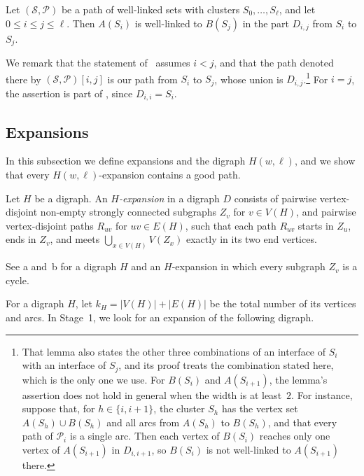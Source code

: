 \documentclass[fontsize=12pt,leading=14pt]{fullpaper}
\newcommand{\Pcal}{\mathcal{P}}
\newcommand{\Scal}{\mathcal{S}}
\newcommand{\Hwl}{H(w,\ell)}
\begin{document}
\begin{proposition}\label{lem:consecutive}
  Let $(\Scal,\Pcal)$ be a path of well-linked sets with clusters $S_0,\dots,S_\ell$, and let $0\le i\le j\le\ell$.
  Then $A(S_i)$ is well-linked to $B(S_j)$ in the part $D_{i,j}$ from $S_i$ to $S_j$.
\end{proposition}

We remark that the statement of~\cite[Lemma~8.4]{HKMM26a} assumes $i<j$, and that the path denoted there by $(\Scal,\Pcal)[i,j]$ is our path from $S_i$ to $S_j$, whose union is $D_{i,j}$.\footnote{%
  That lemma also states the other three combinations of an interface of $S_i$ with an interface of $S_j$, and its proof treats the combination stated here, which is the only one we use.
  For $B(S_i)$ and $A(S_{i+1})$, the lemma's assertion does not hold in general when the width is at least~$2$.
  For instance, suppose that, for $h\in\{i,i+1\}$, the cluster $S_h$ has the vertex set $A(S_h)\cup B(S_h)$ and all arcs from $A(S_h)$ to $B(S_h)$, and that every path of $\Pcal_i$ is a single arc.
Then each vertex of $B(S_i)$ reaches only one vertex of $A(S_{i+1})$ in $D_{i,i+1}$, so $B(S_i)$ is not well-linked to $A(S_{i+1})$ there.}
For $i=j$, the assertion is part of , since $D_{i,i}=S_i$.

\subsection{Expansions}\label{sec:prelim-expansions}

In this subsection we define expansions and the digraph $\Hwl$, and we show that every $\Hwl$-expansion contains a good path.

\begin{definition}[Expansion]\label{def:expansion}
  Let $H$ be a digraph.
  An \emph{$H$-expansion} in a digraph $D$ consists of pairwise vertex-disjoint non-empty strongly connected subgraphs $Z_v$ for $v\in V(H)$, and pairwise vertex-disjoint paths $R_{uv}$ for $uv\in E(H)$, such that each path $R_{uv}$ starts in $Z_u$, ends in $Z_v$, and meets $\bigcup_{x\in V(H)}V(Z_x)$ exactly in its two end vertices.
\end{definition}

See a and~b for a digraph $H$ and an $H$-expansion in which every subgraph $Z_v$ is a cycle.

For a digraph $H$, let $k_H=|V(H)|+|E(H)|$ be the total number of its vertices and arcs.
In Stage~1, we look for an expansion of the following digraph.
\end{document}
